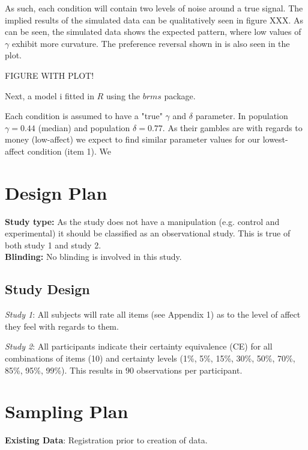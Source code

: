 \documentclass[12pt]{article}
\begin{document}
As such, each condition will contain
two levels of noise around a true signal.
The implied results of the simulated data
can be qualitatively seen in figure XXX.
As can be seen, the simulated data shows
the expected pattern, where low values of
$\gamma$ exhibit more curvature. The preference
reversal shown in \textcite{rottenstreich2001money}
is also seen in the plot.

FIGURE WITH PLOT!

Next, a model i fitted in $R$ using the
 $brms$ package.


Each condition is assumed to have a "true"
$\gamma$ and $\delta$ parameter. In
\textcite{gonzalez1999shape} population $\gamma = 0.44$
(median) and population $\delta = 0.77$. As their
gambles are with regards to money (low-affect)
we expect to find similar parameter values for
our lowest-affect condition (item 1). We




\section{Design Plan}

\textbf{Study type:} As the study does not have
a manipulation (e.g. control and experimental)
it should be classified as an observational study.
This is true of both study 1 and study 2. \\

\textbf{Blinding:} No blinding is involved in this study. \\

\subsection{Study Design}

\emph{Study 1}: All subjects will rate all items
(see Appendix 1) as to the level of affect they
feel with regards to them.

\emph{Study 2}: All participants
indicate their certainty equivalence (CE) for all
combinations of items (10) and certainty levels
(1\%, 5\%, 15\%, 30\%, 50\%, 70\%, 85\%, 95\%, 99\%).
This results in $90$ observations per participant.

\section{Sampling Plan}

\textbf{Existing Data}: Registration prior
to creation of data.
\end{document}
